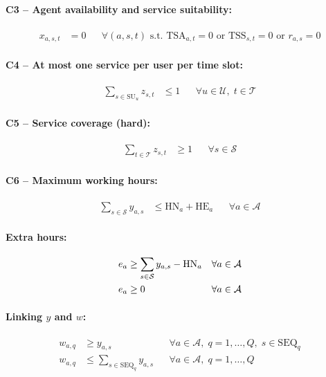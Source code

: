 \documentclass[11pt,a4paper]{article}
\newcommand{\setA}{\mathcal{A}}
\newcommand{\setU}{\mathcal{U}}
\newcommand{\setS}{\mathcal{S}}
\newcommand{\setT}{\mathcal{T}}
\newcommand{\SU}{\mathrm{SU}}
\newcommand{\SEQ}{\mathrm{SEQ}}
\newcommand{\TSA}{\mathrm{TSA}}
\newcommand{\TSS}{\mathrm{TSS}}
\newcommand{\HN}{\mathrm{HN}}
\newcommand{\HE}{\mathrm{HE}}
\begin{document}
\paragraph{C3 -- Agent availability and service suitability:}
\begin{align}
    x_{a,s,t} &= 0
    && \forall (a,s,t) \text{ s.t. } \TSA_{a,t} = 0 \text{ or }
       \TSS_{s,t} = 0 \text{ or } r_{a,s} = 0 \label{eq:c3}
\end{align}

\paragraph{C4 -- At most one service per user per time slot:}
\begin{align}
    \sum_{s \in \SU_u} z_{s,t} &\le 1
    && \forall u \in \setU,\; t \in \setT \label{eq:c4}
\end{align}

\paragraph{C5 -- Service coverage (hard):}
\begin{align}
    \sum_{t \in \setT} z_{s,t} &\ge 1
    && \forall s \in \setS \label{eq:c5}
\end{align}

\paragraph{C6 -- Maximum working hours:}
\begin{align}
    \sum_{s \in \setS} y_{a,s} &\le \HN_a + \HE_a
    && \forall a \in \setA \label{eq:c6-hard}
\end{align}

\paragraph{Extra hours:}
\begin{align}
    e_a &\ge \sum_{s \in \setS} y_{a,s} - \HN_a
    && \forall a \in \setA \label{eq:extra}\\
    e_a &\ge 0
    && \forall a \in \setA  \notag
\end{align}

\paragraph{Linking $y$ and $w$:}
\begin{align}
    w_{a,q} &\ge y_{a,s}
    && \forall a \in \setA,\; q = 1,\ldots,Q,\; s \in \SEQ_q \label{eq:link-yw1}\\
    w_{a,q} &\le \sum_{s \in \SEQ_q} y_{a,s}
    && \forall a \in \setA,\; q = 1,\ldots,Q \label{eq:link-yw2}
\end{align}
\end{document}
